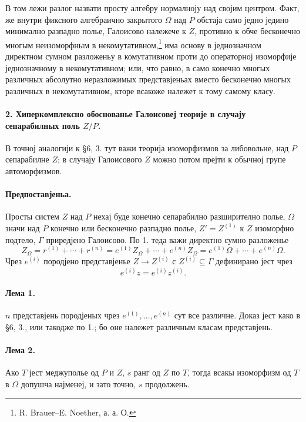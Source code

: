 ﻿\documentclass[11pt]{article}
\begin{document}
В том лежи разлог назвати просту алгебру нормалноју над својим центром. Факт, же внутри фиксного алгебраично закрытого \(\Omega\) над \(P\) обстаја само једно једино минимално разпадно полье, Галоисово належече к \(Z\), противно к обче бесконечно многым неизоморфным в некомутативном,\footnote{R. Brauer--E. Noether, а. а. О.} има основу в једнозначном директном сумном разложеньу в комутативном проти до операторној изоморфије једнозначному в некомутативном; или, что равно, в само конечно многых различных абсолутно неразложимых представјеньах вместо бесконечно многых различных в некомутативном, кторе всакоже належет к тому самому класу.

\paragraph{2. Хиперкомплексно обоснованье Галоисовеј теорије в случају сепарабилных поль \(Z/P\).}
В точној аналогији к §6, 3. тут важи теорија изоморфизмов за либовольне, над \(P\) сепарабилне \(Z\); в случају Галоисового \(Z\) можно потом прејти к обычној групе автоморфизмов.

\paragraph{Предпоставјеньа.}
Просты систем \(Z\) над \(P\) нехај буде конечно сепарабилно разширително полье, \(\Omega\) значи над \(P\) конечно или бесконечно разпадно полье, \(Z'=Z^{(1)}\) к \(Z\) изоморфно подтело, \(\Gamma\) приредјено Галоисово. По 1. теда важи директно сумно разложенье
\[
        Z_\Omega=r^{(1)}+\cdots+r^{(n)}
        =e^{(1)}Z_\Omega+\cdots+e^{(n)}Z_\Omega
        =e^{(1)}\Omega+\cdots+e^{(n)}\Omega .
\]
Чрез \(e^{(i)}\) породјено представјенье \(Z\to Z^{(i)}\) с \(Z^{(i)}\subseteq\Gamma\) дефинирано јест чрез
\[
        e^{(i)}z=e^{(i)}z^{(i)}.
\]

\paragraph{Лема 1.}
\(n\) представјень породјеных чрез \(e^{(1)},\ldots,e^{(n)}\) сут все различне. Доказ јест како в §6, 3., или такодже по 1.; бо оне належет различным класам представјень.

\paragraph{Лема 2.}
Ако \(T\) јест меджуполье од \(P\) и \(Z\), \(s\) ранг од \(Z\) по \(T\), тогда всакы изоморфизм од \(T\) в \(\Omega\) допушча најменеј, и зато точно, \(s\) продолжень.
\end{document}
